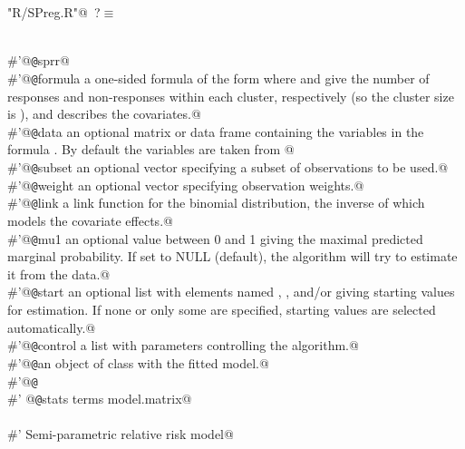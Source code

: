\documentclass[reqno]{amsart}
\renewcommand{\NWtarget}[2]{\hypertarget{#1}{#2}}
\begin{document}
\begin{flushleft} \small\label{scrap3}\raggedright\small
\NWtarget{nuweb?}{} \verb@"R/SPreg.R"@\nobreak\ {\footnotesize {?}}$\equiv$
\vspace{-1ex}
\begin{list}{}{} \item
\mbox{}\verb@@\\
\mbox{}\verb@#'@{\tt @}\verb@rdname sprr@\\
\mbox{}\verb@#'@{\tt @}\verb@param formula a one-sided formula of the form  where  and  give the number of responses and non-responses within each cluster, respectively (so the cluster size is ), and  describes the covariates.@\\
\mbox{}\verb@#'@{\tt @}\verb@param data  an optional matrix or data frame containing the variables in the formula . By default the variables are taken from @\\
\mbox{}\verb@#'@{\tt @}\verb@param subset  an optional vector specifying a subset of observations to be used.@\\
\mbox{}\verb@#'@{\tt @}\verb@param weight  an optional vector specifying observation weights.@\\
\mbox{}\verb@#'@{\tt @}\verb@param link      a link function for the binomial distribution, the inverse of which models the covariate effects.@\\
\mbox{}\verb@#'@{\tt @}\verb@param mu1       an optional value between 0 and 1 giving the maximal predicted marginal probability. If set to NULL (default), the algorithm will try to estimate it from the data.@\\
\mbox{}\verb@#'@{\tt @}\verb@param start     an optional list with elements named , , and/or  giving starting values for estimation. If none or only some are specified, starting values are selected automatically.@\\
\mbox{}\verb@#'@{\tt @}\verb@param control a list with parameters controlling the algorithm.@\\
\mbox{}\verb@#'@{\tt @}\verb@return an object of class  with the fitted model.@\\
\mbox{}\verb@#'@{\tt @}\verb@export@\\
\mbox{}\verb@#' @{\tt @}\verb@importFrom stats terms model.matrix@\\
\mbox{}\verb@@\\
\mbox{}\verb@#' Semi-parametric relative risk model@\\

\end{list}
\end{flushleft}
\end{document}
